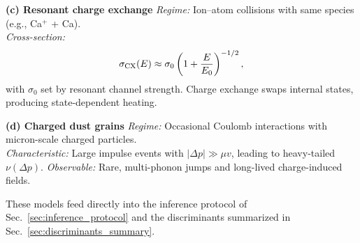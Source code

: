 \medskip
\noindent\textbf{(c) Resonant charge exchange}\quad
\emph{Regime:} Ion--atom collisions with same species (e.g., Ca$^+$ + Ca).\\
\emph{Cross-section:}
\[
\sigma_{\rm CX}(E) \approx \sigma_0\left(1 + \frac{E}{E_0}\right)^{-1/2},
\]
with $\sigma_0$ set by resonant channel strength.
Charge exchange swaps internal states, producing state-dependent heating.

\medskip
\noindent\textbf{(d) Charged dust grains}\quad
\emph{Regime:} Occasional Coulomb interactions with micron-scale charged particles.\\
\emph{Characteristic:} Large impulse events with $|\Delta p| \gg \mu v$, leading to heavy-tailed $\nu(\Delta p)$.
\emph{Observable:} Rare, multi-phonon jumps and long-lived charge-induced fields.

These models feed directly into the inference protocol of Sec.~\ref{sec:inference_protocol}
and the discriminants summarized in Sec.~\ref{sec:discriminants_summary}.
